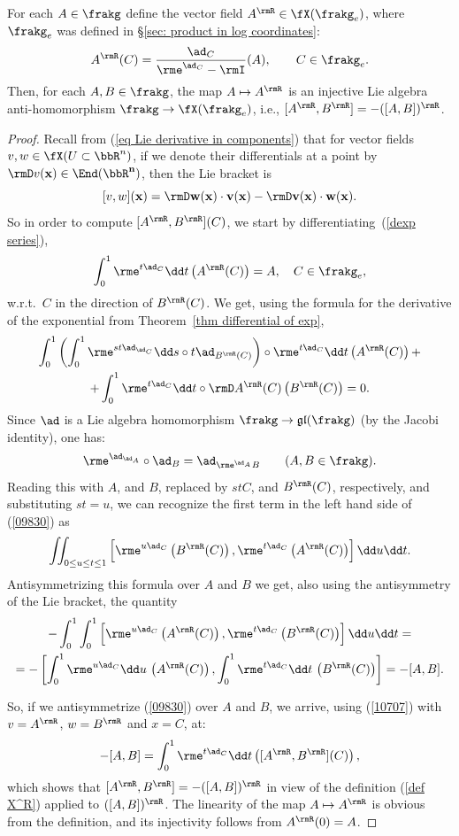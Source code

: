 \begin{lem}[{{\cite[Lem.~1.8.2]{DK}}}]\label{lem 1.8.2 DK}
    For each $A\in\frakg$ define the vector field $A^\rmR\in \fX(\frakg_e)$, where $\frakg_e$ was defined in \S\ref{sec: product in log coordinates}:
    \[ A^\rmR(C)=\frac{\ad_C}{\rme^{\ad_C}-\rmI}(A),\quad \quad C\in\frakg_e. \label{def X^R}\]
    Then, for each $A,B\in\frakg$, the map $A\mapsto A^\rmR$ is an injective Lie algebra anti-homomorphism $\frakg\to \fX(\frakg_e)$, i.e., $[A^\rmR,B^\rmR]=-([A,B])^\rmR$.
\end{lem}
\begin{proof}
    Recall from (\ref{eq Lie derivative in components}) that for vector fields $v,w\in\fX(U\subset\bbR^n)$, if we denote their differentials at a point by $\rmD v(\bf x)\in \End(\bbR^n)$, then the Lie bracket is
    \[[v,w](\bf x)=\rmD w(\bf x)\cdot v(\bf x)-\rmD v(\bf x)\cdot w(\bf x).\label{10707}\]
    So in order to compute $[A^\rmR,B^\rmR](C)$, we start by differentiating~(\ref{dexp series}),
    \[\int_0^1 \rme^{t\ad_C}\dd t \left(A^\rmR(C)\right)=A,\quad C\in\frakg_e,\]
   w.r.t.\ $C$ in the direction of $B^\rmR(C)$. We get, using the formula for the derivative of the exponential from Theorem~\ref{thm differential of exp}, 
    \begin{multline}
        \int_0^1 \left(\int_0^1\rme^{st\ad_{\ad_C}} \dd s\circ t\ad_{B^\rmR(C)}\right)\circ \rme^{t\ad_C}\dd t\left(A^\rmR(C)\right)+\\
        +\int_0^1\rme^{t\ad_C}\dd t\circ \rmD A^\rmR(C)\left(B^\rmR(C)\right)=0.\label{09830}
    \end{multline} 
    Since $\ad$ is a Lie algebra homomorphism $\frakg\to\mathfrak{gl}(\frakg)$ (by the Jacobi identity), one has:
    \[\rme^{\ad_{\ad_A}}\circ \ad_B=\ad_{\rme^{\ad_A} B}\quad \quad (A,B\in\frakg).\]
    Reading this with $A$, and $B$, replaced by $stC$, and $B^\rmR(C)$, respectively, and substituting $st=u$, we can recognize the first term in the left hand side of (\ref{09830}) as
    \[\iint_{0\leq u\leq t\leq 1}\left[\rme^{u\ad_C}\left(B^\rmR(C)\right),\rme^{t\ad_C}\left(A^\rmR(C)\right)\right]\dd u\dd t.\]
    Antisymmetrizing this formula over $A$ and $B$  we get, also using the antisymmetry of the Lie bracket, the quantity
    \begin{multline}
        -\int_0^1\int_0^1\left[\rme^{u\ad_C}\left(A^\rmR(C)\right),\rme^{t\ad_C}\left(B^\rmR(C)\right)\right]\dd u\dd t=\\
        =-\left[\int_0^1\rme^{u\ad_C}\dd u\, \left(A^\rmR(C)\right),\int_0^1\rme^{t\ad_C}\dd t\, \left(B^\rmR(C)\right)\right]=-[A,B].
    \end{multline}

    So, if we antisymmetrize (\ref{09830}) over $A$ and $B$, we arrive, using (\ref{10707}) with $v=A^\rmR$, $w=B^\rmR$ and $x=C$, at:
    \[-[A,B]=\int_0^1 \rme^{t\ad_C}\dd t\left([A^\rmR,B^\rmR](C)\right),\]
    which shows that $[A^\rmR,B^\rmR]=-([A,B])^\rmR$ in view of the definition (\ref{def X^R}) applied to $([A,B])^\rmR$. The linearity of the map $A\mapsto A^\rmR$ is obvious from the definition, and its injectivity follows from $A^\rmR(0)=A$.
\end{proof}
